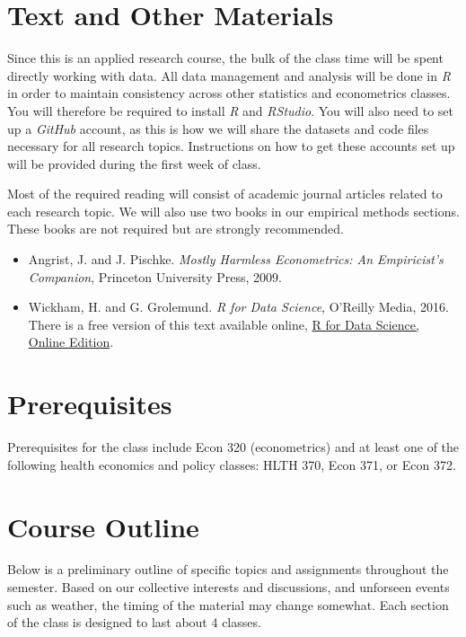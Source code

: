 \documentclass{article}
\begin{document}
\section*{Text and Other Materials}
Since this is an applied research course, the bulk of the class time will be spent directly working with data. All data management and analysis will be done in \textit{R} in order to maintain consistency across other statistics and econometrics classes. You will therefore be required to install \textit{R} and \textit{RStudio}. You will also need to set up a \textit{GitHub} account, as this is how we will share the datasets and code files necessary for all research topics. Instructions on how to get these accounts set up will be provided during the first week of class.

Most of the required reading will consist of academic journal articles related to each research topic. We will also use two books in our empirical methods sections. These books are not required but are strongly recommended.
\begin{itemize}
 \item Angrist, J. and J. Pischke. \textit{Mostly Harmless Econometrics: An Empiricist's Companion}, Princeton University Press, 2009.
 \item Wickham, H. and G. Grolemund. \textit{R for Data Science}, O'Reilly Media, 2016. There is a free version of this text available online, \href{https://r4ds.had.co.nz/}{R for Data Science, Online Edition}.
\end{itemize}

\section*{Prerequisites}
Prerequisites for the class include Econ 320 (econometrics) and at least one of the following health economics and policy classes: HLTH 370, Econ 371, or Econ 372.

\newpage
\section*{Course Outline}
Below is a preliminary outline of specific topics and assignments throughout the semester. Based on our collective interests and discussions, and unforseen events such as weather, the timing of the material may change somewhat. Each section of the class is designed to last about 4 classes.
\end{document}
